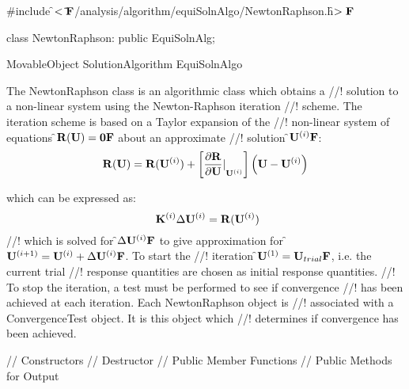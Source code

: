 
\indent \#include \f$<\tilde{
}{\bf F}$/analysis/algorithm/equiSolnAlgo/NewtonRaphson.h\f$>{\bf F}$ 

\indent class NewtonRaphson: public EquiSolnAlg;

\indent MovableObject
\indent\indent SolutionAlgorithm
\indent\indent\indent EquiSolnAlgo
\indent\indent\indent{}

\indent The NewtonRaphson class is an algorithmic class which obtains a
//! solution to a non-linear system using the Newton-Raphson iteration
//! scheme. The iteration scheme is based on a Taylor expansion of the
//! non-linear system of equations \f${\bf R}({\bf U}) = {\bf 0}{\bf F}$ about an approximate
//! solution \f${\bf U}^{(i)}{\bf F}$:
\begin{equation} 
{\bf R}({\bf U}) = 
{\bf R}({\bf U}^{(i)}) +
\left[ {\frac{\partial {\bf R}}{\partial {\bf U}} \vert}_{{\bf U}^{(i)}}\right]
\left( {\bf U} - {\bf U}^{(i)} \right) 
\end{equation}

\noindent which can be expressed as:
\begin{equation} \
{\bf K}^{(i)}  \Delta {\bf U}^{(i)} = {\bf R}({\bf U}^{(i)})
\end{equation}
//! which is solved for \f$\Delta {\bf U}^{(i)}{\bf F}$ to give approximation for
\f${\bf U}^{(i+1)} = {\bf U}^{(i)} + \Delta {\bf U}^{(i)}{\bf F}$. To start the
//! iteration \f${\bf U}^{(1)} = {\bf U}_{trial}{\bf F}$, i.e. the current trial
//! response quantities are chosen as initial response quantities. 
//! To stop the iteration, a test must be performed to see if convergence
//! has been achieved at each iteration. Each NewtonRaphson object is
//! associated with a ConvergenceTest object. It is this object which
//! determines if convergence has been achieved.

\indent // Constructors 
\indent // Destructor
\indent // Public Member Functions
\indent // Public Methods  for Output

